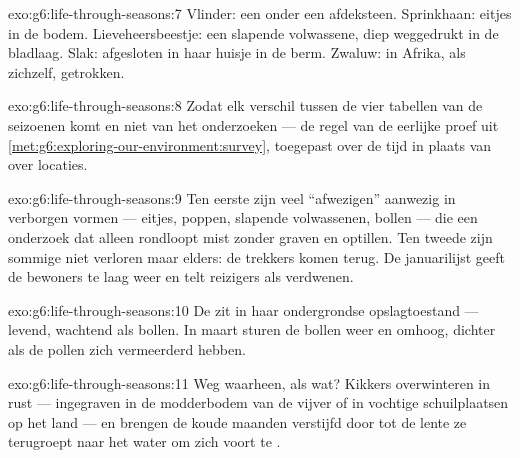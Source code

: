 \begin{solution}{exo:g6:life-through-seasons:7}
Vlinder: een  onder een afdeksteen. Sprinkhaan: eitjes in de bodem.
Lieveheersbeestje: een slapende volwassene, diep weggedrukt in de
bladlaag. Slak: afgesloten in haar huisje in de berm. Zwaluw: in Afrika,
als zichzelf, getrokken.
\end{solution}

\begin{solution}{exo:g6:life-through-seasons:8}
Zodat elk verschil tussen de vier tabellen van de seizoenen komt en niet
van het onderzoeken --- de regel van de eerlijke proef uit
\cref{met:g6:exploring-our-environment:survey}, toegepast over de tijd in
plaats van over locaties.
\end{solution}

\begin{solution}{exo:g6:life-through-seasons:9}
Ten eerste zijn veel ``afwezigen'' aanwezig in verborgen vormen ---
eitjes, poppen, slapende volwassenen, bollen --- die een onderzoek dat
alleen rondloopt mist zonder graven en optillen. Ten tweede zijn sommige
niet verloren maar elders: de trekkers komen terug. De januarilijst geeft
de bewoners te laag weer en telt reizigers als verdwenen.
\end{solution}

\begin{solution}{exo:g6:life-through-seasons:10}
De  zit in haar ondergrondse opslagtoestand --- levend, wachtend als
bollen. In maart sturen de bollen weer  en  omhoog,
dichter als de pollen zich vermeerderd hebben.
\end{solution}

\begin{solution}{exo:g6:life-through-seasons:11}
Weg waarheen, als wat? Kikkers overwinteren in rust --- ingegraven in de
modderbodem van de vijver of in vochtige schuilplaatsen op het land ---
en brengen de koude maanden verstijfd door tot de lente ze terugroept
naar het water om zich voort te .
\end{solution}

